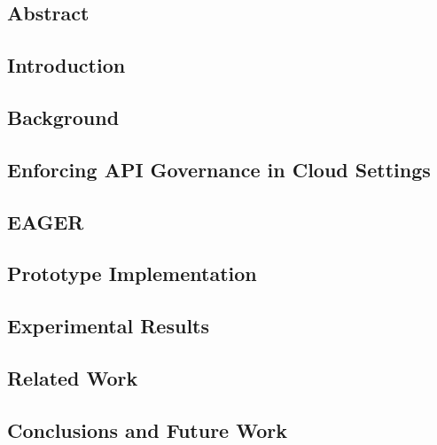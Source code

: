 \subsection{Abstract}


\subsection{Introduction}
\label{sec:intro}


\subsection{Background}
\label{sec:bg}


\subsection{Enforcing API Governance in Cloud Settings}
\label{sec:enforce}


\subsection{EAGER}
\label{sec:eager}


\subsection{Prototype Implementation}
\label{sec:prototype_impl}


\subsection{Experimental Results}
\label{sec:results}


\subsection{Related Work}
\label{sec:related_work}


\subsection{Conclusions and Future Work}
\label{sec:conc}

